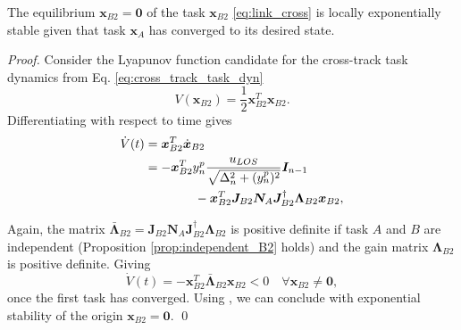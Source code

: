\documentclass[../main.tex]{subfiles}
\begin{document}
\begin{lemma}
    \label{lem:task_B2}
    The equilibrium $\bm{x}_{B2} = \bm{0}$ of the task $\bm{x}_{B2}$ \eqref{eq:link_cross} is locally exponentially stable given that task $\bm{x}_A$ has converged to its desired state.
\end{lemma}
\begin{proof}
    Consider the Lyapunov function candidate for the cross-track task dynamics from Eq. \eqref{eq:cross_track_task_dyn}
    \begin{equation}
        \label{eq:V_B2}
        V(\bm{x}_{B2}) = \frac{1}{2} \bm{x}_{B2}^T\bm{x}_{B2}.
    \end{equation}
    Differentiating with respect to time gives
    \begin{align}
        \label{eq:V_dot_B2}
        \dot{V}(t) &= \bm{x}_{B2}^T \dot{\bm{x}}_{B2} \\ \notag
        &= -\bm{x}_{B2}^T y_n^p\frac{u_{LOS}}{\sqrt{\Delta_n^2 + (y_n^p)^2}} \bm{I}_{n-1} \notag \\
        &\qquad\qquad -\bm{x}_{B2}^T \bm{J}_{B2} \bm{N}_A \bm{J}_{B2}^\dagger \bm{\Lambda}_{B2} \bm{x}_{B2} \notag,
    \end{align}

    Again, the matrix $\bar{\bm{\Lambda}}_{B2} = \bm{J}_{B2}\bm{N}_A \bm{J}_{B2}^\dagger \bm{\Lambda}_{B2}$ is positive definite if task $A$ and $B$ are independent (Proposition \ref{prop:independent_B2} holds) and the gain matrix $\bm{\Lambda}_{B2}$ is positive definite. Giving
    \begin{equation}
        \dot{V}(t) = -\bm{x}_{B2}^T \bar{\bm{\Lambda}}_{B2} \bm{x}_{B2} < 0 \quad \forall \bm{x}_{B2} \neq \bm{0},
    \end{equation}
    once the first task has converged. Using \cite[Theorem 4.10]{khalil2002}, we can conclude with exponential stability of the origin $\bm{x}_{B2} = \bm{0}$. \qed
\end{proof}
\end{document}

